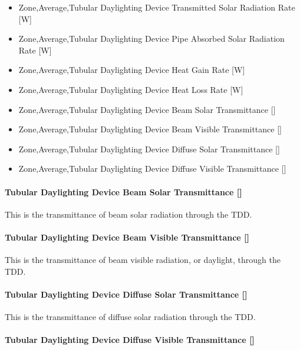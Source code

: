 \begin{itemize}
\item
  Zone,Average,Tubular Daylighting Device Transmitted Solar Radiation Rate {[}W{]}
\item
  Zone,Average,Tubular Daylighting Device Pipe Absorbed Solar Radiation Rate {[}W{]}
\item
  Zone,Average,Tubular Daylighting Device Heat Gain Rate {[}W{]}
\item
  Zone,Average,Tubular Daylighting Device Heat Loss Rate {[}W{]}
\item
  Zone,Average,Tubular Daylighting Device Beam Solar Transmittance {[]}
\item
  Zone,Average,Tubular Daylighting Device Beam Visible Transmittance {[]}
\item
  Zone,Average,Tubular Daylighting Device Diffuse Solar Transmittance {[]}
\item
  Zone,Average,Tubular Daylighting Device Diffuse Visible Transmittance {[]}
\end{itemize}

\paragraph{Tubular Daylighting Device Beam Solar Transmittance {[]}}\label{tubular-daylighting-device-beam-solar-transmittance}

This is the transmittance of beam solar radiation through the TDD.

\paragraph{Tubular Daylighting Device Beam Visible Transmittance {[]}}\label{tubular-daylighting-device-beam-visible-transmittance}

This is the transmittance of beam visible radiation, or daylight, through the TDD.

\paragraph{Tubular Daylighting Device Diffuse Solar Transmittance {[]}}\label{tubular-daylighting-device-diffuse-solar-transmittance}

This is the transmittance of diffuse solar radiation through the TDD.

\paragraph{Tubular Daylighting Device Diffuse Visible Transmittance {[]}}\label{tubular-daylighting-device-diffuse-visible-transmittance}

